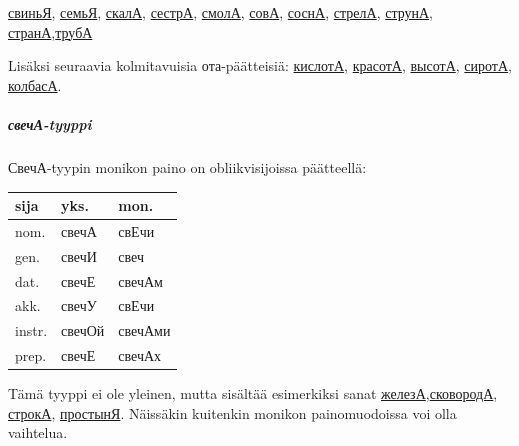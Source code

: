 \documentclass[]{scrartcl}
\begin{document}
\href{http://ru.wiktionary.org/wiki/\%D1\%81\%D0\%B2\%D0\%B8\%D0\%BD\%D1\%8C\%D1\%8F}{свиньЯ},
\href{http://ru.wiktionary.org/wiki/\%D1\%81\%D0\%B5\%D0\%BC\%D1\%8C\%D1\%8F}{семьЯ},
\href{http://ru.wiktionary.org/wiki/\%D1\%81\%D0\%BA\%D0\%B0\%D0\%BB\%D0\%B0}{скалА},
\href{http://ru.wiktionary.org/wiki/\%D1\%81\%D0\%B5\%D1\%81\%D1\%82\%D1\%80\%D0\%B0}{сестрА},
\href{http://ru.wiktionary.org/wiki/\%D1\%81\%D0\%BC\%D0\%BE\%D0\%BB\%D0\%B0}{смолА},
\href{http://ru.wiktionary.org/wiki/\%D1\%81\%D0\%BE\%D0\%B2\%D0\%B0}{совА},
\href{http://ru.wiktionary.org/wiki/\%D1\%81\%D0\%BE\%D1\%81\%D0\%BD\%D0\%B0}{соснА},
\href{http://ru.wiktionary.org/wiki/\%D1\%81\%D1\%82\%D1\%80\%D0\%B5\%D0\%BB\%D0\%B0}{стрелА},
\href{http://ru.wiktionary.org/wiki/\%D1\%81\%D1\%82\%D1\%80\%D1\%83\%D0\%BD\%D0\%B0}{струнА},
\href{http://ru.wiktionary.org/wiki/\%D1\%81\%D1\%82\%D1\%80\%D0\%B0\%D0\%BD\%D0\%B0}{странА},\href{http://ru.wiktionary.org/wiki/\%D1\%82\%D1\%80\%D1\%83\%D0\%B1\%D0\%B0}{трубА}

Lisäksi seuraavia kolmitavuisia ота-päätteisiä:
\href{http://ru.wiktionary.org/wiki/\%D0\%BA\%D0\%B8\%D1\%81\%D0\%BB\%D0\%BE\%D1\%82\%D0\%B0}{кислотА},
\href{http://ru.wiktionary.org/wiki/\%D0\%BA\%D1\%80\%D0\%B0\%D1\%81\%D0\%BE\%D1\%82\%D0\%B0}{красотА},
\href{http://ru.wiktionary.org/wiki/\%D0\%B2\%D1\%8B\%D1\%81\%D0\%BE\%D1\%82\%D0\%B0}{высотА},
\href{http://ru.wiktionary.org/wiki/\%D1\%81\%D0\%B8\%D1\%80\%D0\%BE\%D1\%82\%D0\%B0}{сиротА},
\href{http://ru.wiktionary.org/wiki/\%D0\%BA\%D0\%BE\%D0\%BB\%D0\%B1\%D0\%B0\%D1\%81\%D0\%B0}{колбасА}.

\subparagraph{свечА-tyyppi}\label{ux441ux432ux435ux447ux430-tyyppi}

СвечА-tyypin monikon paino on obliikvisijoissa päätteellä:

\begin{longtable}[c]{@{}lll@{}}
\toprule
sija & yks. & mon.\tabularnewline
\midrule
\endhead
nom. & свечА & свЕчи\tabularnewline
gen. & свечИ & свеч\tabularnewline
dat. & свечЕ & свечАм\tabularnewline
akk. & свечУ & свЕчи\tabularnewline
instr. & свечОй & свечАми\tabularnewline
prep. & свечЕ & свечАх\tabularnewline
\bottomrule
\end{longtable}

Tämä tyyppi ei ole yleinen, mutta sisältää esimerkiksi sanat
\href{http://ru.wiktionary.org/wiki/\%D0\%B6\%D0\%B5\%D0\%BB\%D0\%B5\%D0\%B7\%D0\%B0}{железА},\href{http://ru.wiktionary.org/wiki/\%D1\%81\%D0\%BA\%D0\%BE\%D0\%B2\%D0\%BE\%D1\%80\%D0\%BE\%D0\%B4\%D0\%B0}{сковородА},
\href{http://ru.wiktionary.org/wiki/\%D1\%81\%D1\%82\%D1\%80\%D0\%BE\%D0\%BA\%D0\%B0}{строкА},
\href{http://ru.wiktionary.org/wiki/\%D0\%BF\%D1\%80\%D0\%BE\%D1\%81\%D1\%82\%D1\%8B\%D0\%BD\%D1\%8F}{простынЯ}.
Näissäkin kuitenkin monikon painomuodoissa voi olla vaihtelua.
\end{document}
